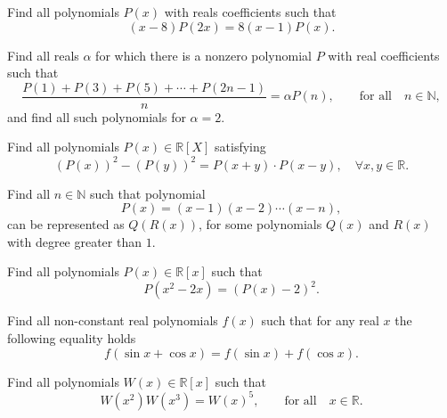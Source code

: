 \documentclass[12pt,a4paper]{memoir}
\theoremstyle{definition}
\begin{document}
\begin{question}
	Find all polynomials $ P(x)$ with reals coefficients such that
	\[(x-8)P(2x)=8(x-1)P(x).\]
\end{question}


\begin{question}
	Find all reals $ \alpha$ for which there is a nonzero polynomial $P$ with real coefficients such that 
	\[\frac{P(1)+P(3)+P(5)+\cdots+P(2n-1)}{n}=\alpha P(n), \qquad \text{for all} \quad n \in \mathbb N,\]
	and find all such polynomials for $\alpha=2$.
\end{question}





\begin{question}
	Find all polynomials $ P(x) \in \mathbb{R}[X]$ satisfying 
	\[ (P(x))^2-(P(y))^2=P(x+y)\cdot P(x-y) ,\quad  \forall x,y \in \mathbb R.\]
\end{question}





\begin{question}
	Find all $ n\in\mathbb{N}$ such that polynomial
	\[ P(x) = (x - 1)(x - 2) \cdots (x -n),\]
	can be represented as $Q(R(x))$, for some polynomials $Q(x)$ and $R(x)$ with degree greater than $1$.
\end{question}





\begin{question}
	Find all polynomials $ P(x) \in \mathbb R[x]$ such that
	\[P(x^2-2x)=\left( P(x)-2 \right)^2.\]
\end{question}





\begin{question}
	Find all non-constant real polynomials $f(x)$ such that for any real $x$ the following equality holds
	\[ f(\sin x +\cos x) = f(\sin x) + f(\cos x).\]
\end{question}





\begin{question}
	Find all polynomials $ W(x)\in \mathbb R[x]$ such that
	\[W(x^2)W(x^3)=W(x)^5, \qquad \text{for all} \quad x \in \mathbb R.\]
\end{question}
\end{document}
